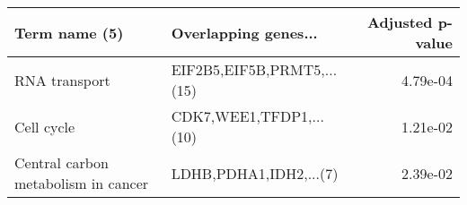 \begin{tabular}{llr}
\toprule
                      Term name (5) &       Overlapping genes... &  Adjusted p-value \\
\midrule
                      RNA transport & EIF2B5,EIF5B,PRMT5,...(15) &          4.79e-04 \\
                         Cell cycle &    CDK7,WEE1,TFDP1,...(10) &          1.21e-02 \\
Central carbon metabolism in cancer &     LDHB,PDHA1,IDH2,...(7) &          2.39e-02 \\
\bottomrule
\end{tabular}
